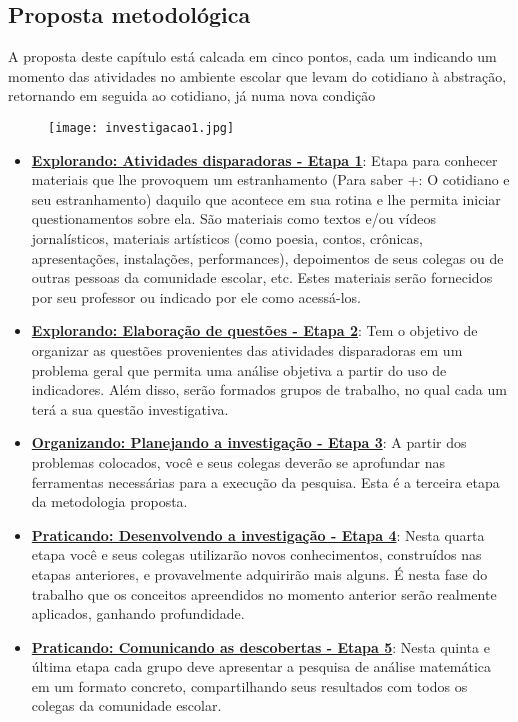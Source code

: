\subsection{Proposta metodológica}

A proposta deste capítulo está calcada em cinco pontos, cada um indicando um momento das atividades no ambiente escolar que levam do cotidiano à abstração, retornando em seguida ao cotidiano, já numa nova condição

\begin{figure}[H]
\label{etapas-metodologicas}
\centering
\texttt{[image: investigacao1.jpg]}

\end{figure}

\begin{itemize}
\item \hyperref[etapa1]{\textcolor{session1}{\textbf{Explorando: Atividades disparadoras - Etapa 1}}}: Etapa para conhecer materiais que lhe provoquem um estranhamento (Para saber +: O cotidiano e seu estranhamento) daquilo que acontece em sua rotina e lhe permita iniciar questionamentos sobre ela. São materiais como textos e/ou vídeos jornalísticos, materiais artísticos (como poesia, contos, crônicas, apresentações, instalações, performances), depoimentos de seus colegas ou de outras pessoas da comunidade escolar, etc. Estes materiais serão fornecidos por seu professor ou indicado por ele como acessá-los.

\item \hyperref[etapa2]{\textcolor{session1}{\textbf{Explorando: Elaboração de questões - Etapa 2}}}: Tem o objetivo de organizar as questões provenientes das atividades disparadoras em um problema geral que permita uma análise objetiva a partir do uso de indicadores. Além disso, serão formados grupos de trabalho, no qual cada um terá a sua questão investigativa.

\item \hyperref[etapa3]{\textcolor{session4}{\textbf{Organizando: Planejando a investigação - Etapa 3}}}: A partir dos problemas colocados, você e seus colegas deverão se aprofundar nas ferramentas necessárias para a execução da pesquisa. Esta é a terceira etapa da metodologia proposta.

\item \hyperref[etapa4]{\textcolor{session2}{\textbf{Praticando: Desenvolvendo a investigação - Etapa 4}}}: Nesta quarta etapa você e seus colegas utilizarão novos conhecimentos, construídos nas etapas anteriores, e provavelmente adquirirão mais alguns. É nesta fase do trabalho que os conceitos apreendidos no momento anterior serão realmente aplicados, ganhando profundidade. 

\item \hyperref[etapa5]{\textcolor{session2}{\textbf{Praticando: Comunicando as descobertas - Etapa 5}}}: Nesta quinta e última etapa cada grupo deve apresentar a pesquisa de análise matemática em um formato concreto, compartilhando seus resultados com todos os colegas da comunidade escolar.
\end{itemize}

